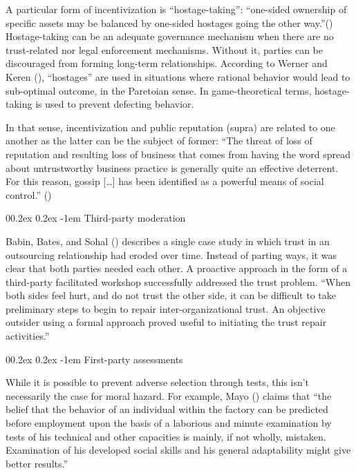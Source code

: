 \documentclass[
  man,floatsintext]{apa6}
\makeatletter
\let\oldparagraph\paragraph
\renewcommand{\paragraph}[1]{\oldparagraph{#1}\mbox{}}
\renewcommand{\paragraph}{\@startsection{paragraph}{4}{\parindent}%
  {0\baselineskip \@plus 0.2ex \@minus 0.2ex}%
  {-1em}%
  {\normalfont\normalsize\bfseries\itshape\typesectitle}}
\makeatother
\begin{document}
A particular form of incentivization is ``hostage-taking'': ``one-sided ownership of specific assets may be balanced by one-sided hostages going the other way.''() Hostage-taking can be an adequate governance mechanism when there are no trust-related nor legal enforcement mechanisms. Without it, parties can be discouraged from forming long-term relationships. According to Werner and Keren (), ``hostages'' are used in situations where rational behavior would lead to sub-optimal outcome, in the Paretoian sense. In game-theoretical terms, hostage-taking is used to prevent defecting behavior.

In that sense, incentivization and public reputation (supra) are related to one another as the latter can be the subject of former: ``The threat of loss of reputation and resulting loss of business that comes from having the word spread about untrustworthy business practice is generally quite an effective deterrent. For this reason, gossip {[}\ldots{]} has been identified as a powerful means of social control.'' ()

\paragraph{Third-party moderation}\label{third-party-moderation}

Babin, Bates, and Sohal () describes a single case study in which trust in an outsourcing relationship had eroded over time. Instead of parting ways, it was clear that both parties needed each other. A proactive approach in the form of a third-party facilitated workshop successfully addressed the trust problem. ``When both sides feel hurt, and do not trust the other side, it can be difficult to take preliminary steps to begin to repair inter-organizational trust. An objective outsider using a formal approach proved useful to initiating the trust repair activities.''

\paragraph{First-party assessments}\label{first-party-assessments}

While it is possible to prevent adverse selection through tests, this isn't necessarily the case for moral hazard. For example, Mayo () claims that ``the belief that the behavior of an individual within the factory can be predicted before employment upon the basis of a laborious and minute examination by tests of his technical and other capacities is mainly, if not wholly, mistaken. Examination of his developed social skills and his general adaptability might give better results.''
\end{document}
